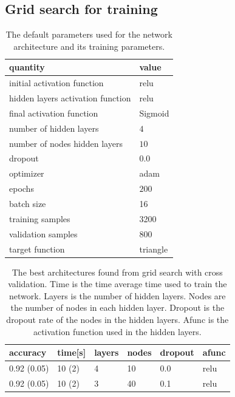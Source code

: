 \documentclass[prl,twocolumn]{revtex4-1}
\begin{document}
\subsection{Grid search for training}



\begin{table}[!b]
\begin{center}
\begin{tabular}{ll}
quantity & value \\
\hline
initial activation function & relu \\
hidden layers activation function & relu\\
final activation function & Sigmoid \\
number of hidden layers & $4$ \\
number of nodes hidden layers & $10$\\
dropout & $0.0$\\
optimizer & adam\\
epochs & $200$ \\
batch size & 16\\
training samples & 3200\\
validation samples & 800\\
target function & triangle
\end{tabular}
\end{center}
\caption{The default parameters used for the network architecture and its training parameters.}
\label{tab:optimal_value}
\end{table}

 
 
\begin{table}[!b]
\begin{center}
\begin{tabular}{llllll}
\hline
accuracy & time[s] & layers & nodes & dropout & afunc \\
\hline
0.92 (0.05) & 10 (2) & 4 & 10 & 0.0 & relu\\
0.92 (0.05) & 10 (2) & 3 & 40 & 0.1& relu\\
\hline
\end{tabular}
\end{center}
\caption{The best architectures found from grid search with cross validation. Time is the time average time used to train the network. Layers is the number of hidden layers. Nodes are the number of nodes in each hidden layer. Dropout is the dropout rate of the nodes in the hidden layers. Afunc is the activation function used in the hidden layers.}
\label{tab:grid_search_architecture}
\end{table}
\end{document}
